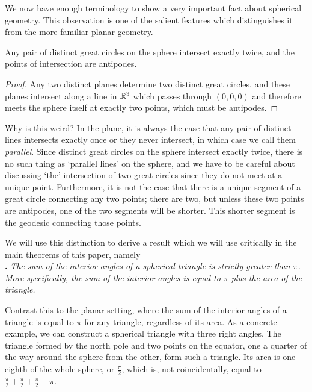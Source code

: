 We now have enough terminology to show a very important fact about spherical geometry.  This  observation is one of the salient features which distinguishes it from the more familiar planar geometry.


\begin{claim}
	Any pair of distinct great circles on the sphere intersect exactly twice, and the points of intersection are antipodes.
\end{claim}
\begin{proof}
	Any two distinct planes determine two distinct great circles, and these planes intersect along a line in $\mathbb{R}^3$ which passes through $(0,0,0)$ and therefore meets the sphere itself at exactly two points, which must be antipodes.
\end{proof}



Why is this weird? In the plane, it is always the case that any pair of distinct lines intersects exactly once or they never intersect, in which case we call them \textit{parallel}. Since distinct great circles on the sphere intersect exactly twice, there is no such thing as `parallel lines' on the sphere, and we have to be careful about discussing `the' intersection of two great circles since they do not meet at a unique point.  Furthermore, it is not the case that there is a unique segment of a great circle connecting any two points; there are two, but unless these two points are antipodes, one of the two segments will be shorter.  This shorter segment is the geodesic connecting those points.



We will use this distinction to derive a result which we will use critically in the main theorems of this paper, namely\\

\noindent\textbf{.}
\emph{The sum of the interior angles of a spherical triangle is strictly greater than $\pi$.  More specifically, the sum of the interior angles is equal to $\pi$ plus the area of the triangle.}

Contrast this to the planar setting, where the sum of the interior angles of a triangle is equal to $\pi$ for any triangle, regardless of its area.  As a concrete example, we can construct a spherical triangle with three right angles.  The triangle formed by the north pole and two points on the equator, one a quarter of the way around the sphere from the other, form such a triangle.  Its area is one eighth of the whole sphere, or $\tfrac{\pi}{2}$, which is, not coincidentally, equal to $\tfrac{\pi}{2}+\tfrac{\pi}{2}+\tfrac{\pi}{2} - \pi$.


